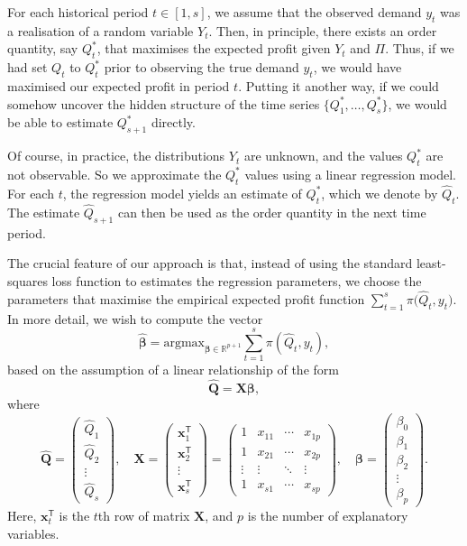 \documentclass{article}
\begin{document}
For each historical period $t\in [1,s]$, we assume that the observed demand $y_t$ was a realisation of a random variable $Y_t$. Then, in principle, there exists an order quantity, say $Q_t^*$, that maximises the expected profit given $Y_t$ and $\Pi$. Thus, if we had set $Q_t$ to $Q_t^*$ prior to observing the true demand $y_t$, we would have maximised our expected profit in period $t$. Putting it another way, if we could somehow uncover the hidden structure of the time series $\big\{ Q_1^*,\dots,Q_s^* \big\}$, we would be able to estimate $Q_{s+1}^*$ directly.

Of course, in practice, the distributions $Y_t$ are unknown, and the values $Q_t^*$ are not observable. So we approximate the $Q_t^*$ values using a linear regression model. For each $t$, the regression model yields an estimate of $Q^*_t$, which we denote by $\hat{Q}_t$. The estimate $\hat{Q}_{s+1}$ can then be used as the order quantity in the next time period.

The crucial feature of our approach is that, instead of using the standard least-squares loss function to estimates the regression parameters, we choose the parameters that maximise the empirical expected profit function $\sum_{t=1}^s{\pi \big( \hat{Q}_t,y_t \big)}$. In more detail, we wish to compute the vector
\[
    \hat{\boldsymbol{\beta}}=\text{argmax}_{\boldsymbol{\beta}\in \mathbb{R}^{p+1}}\displaystyle\sum_{t=1}^s{\pi(\hat{Q}_t,y_t)},
\]
based on the assumption of a linear relationship of the form
\[
    \mathbf{\hat{Q}}=\mathbf{X}\boldsymbol{\beta},
\]
where
\[
    \mathbf{\hat{Q}}=
    \begin{pmatrix}
        \hat{Q}_1\\
        \hat{Q}_2\\
        \vdots\\
        \hat{Q}_s
    \end{pmatrix}, \quad
    \mathbf{X}=
    \begin{pmatrix}
        \mathbf{x}_1^{\mathsf{T}}\\
        \mathbf{x}_2^{\mathsf{T}}\\
        \vdots\\
        \mathbf{x}_s^{\mathsf{T}}
    \end{pmatrix}=
    \begin{pmatrix}
        1&x_{11}&\cdots &x_{1p}\\
        1&x_{21}&\cdots &x_{2p}\\
        \vdots &\vdots &\ddots &\vdots \\
        1&x_{s1}&\cdots &x_{sp}
    \end{pmatrix}, \quad
    \boldsymbol{\beta}=
    \begin{pmatrix}
        \beta_0\\
        \beta_1\\
        \beta_2\\
        \vdots\\
        \beta_{p}
    \end{pmatrix}.
\]
Here, $\mathbf{x}_t^{\mathsf{T}}$ is the $t$th row of matrix $\mathbf{X}$,
and $p$ is the number of explanatory variables.
\end{document}
